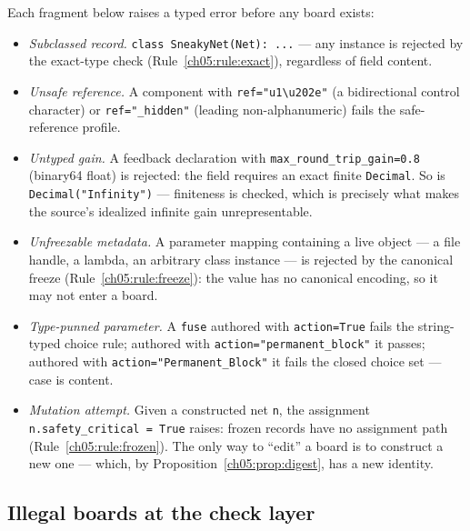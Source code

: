 \begin{example}\label{ch05:ex:construct}
Each fragment below raises a typed error before any board exists:

\begin{itemize}
\item \emph{Subclassed record.} \texttt{class SneakyNet(Net): ...} ---
any instance is rejected by the exact-type check
(Rule~\ref{ch05:rule:exact}), regardless of field content.
\item \emph{Unsafe reference.} A component with
\texttt{ref="u1\textbackslash u202e"} (a bidirectional control
character) or \texttt{ref="\_hidden"} (leading non-alphanumeric) fails
the safe-reference profile.
\item \emph{Untyped gain.} A feedback declaration with
\texttt{max\_round\_trip\_gain=0.8} (binary64 float) is rejected: the
field requires an exact finite \texttt{Decimal}. So is
\texttt{Decimal("Infinity")} --- finiteness is checked, which is
precisely what makes the source's idealized infinite gain
unrepresentable.
\item \emph{Unfreezable metadata.} A parameter mapping containing a live
object --- a file handle, a lambda, an arbitrary class instance --- is
rejected by the canonical freeze
(Rule~\ref{ch05:rule:freeze}): the value has no canonical encoding, so
it may not enter a board.
\item \emph{Type-punned parameter.} A \texttt{fuse} authored with
\texttt{action=True} fails the string-typed choice rule; authored with
\texttt{action="permanent\_block"} it passes; authored with
\texttt{action="Permanent\_Block"} it fails the closed choice set ---
case is content.
\item \emph{Mutation attempt.} Given a constructed net \texttt{n},
the assignment \texttt{n.safety\_critical = True} raises: frozen
records have no assignment path
(Rule~\ref{ch05:rule:frozen}). The only way to ``edit'' a board is to
construct a new one --- which, by
Proposition~\ref{ch05:prop:digest}, has a new identity.
\end{itemize}
\end{example}

\subsection{Illegal boards at the check layer}\label{ch05:sec:illegaldrc}

